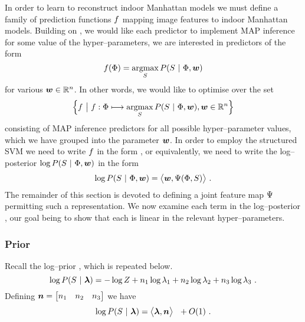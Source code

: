 In order to learn to reconstruct indoor Manhattan models we must
define a family of prediction functions $\Predictor$ mapping image
features to indoor Manhattan models. Building on ,
we would like each predictor to implement MAP inference for some
value of the hyper--parameters, \ie we are interested in predictors of
the form
\begin{equation}
  \label{eq:map-predictor}
  \Predictor(\Features) = 
  \argmax_{\Seam}\limits P(\Seam ~|~ \Features,\Model)
\end{equation}
for various $\Model\in\Reals^n$. In other words, we would like to
optimise over the set
\begin{equation}
  \Bigl\{ 
    \Predictor ~\bigl|~
    \Predictor: \Features \longmapsto 
    \argmax_{\Seam}\limits P(\Seam ~|~ \Features,\Model), \Model\in\Reals^n
  \Bigr\}
\end{equation}
consisting of MAP inference predictors for all possible
hyper--parameter values, which we have grouped into the parameter
$\Model$. In order to employ the structured SVM we need to write
$\Predictor$ in the form , or equivalently, we need
to write the log--posterior $\log P(\Seam ~|~ \Features,\Model)$ in the form
\begin{equation}
  \log P(\Seam ~|~ \Features,\Model)
  =
  \bigl\langle \Model, \JointFtr(\Features,\Seam) \bigr\rangle ~.
\end{equation}
The remainder of this section is devoted to defining a joint feature
map $\JointFtr$ permitting such a representation. We now examine each
term in the log--posterior , our goal being to
show that each is linear in the relevant hyper--parameters.

\subsubsection{Prior}
Recall the log--prior , which is repeated
below.
\begin{equation}
  \label{eq:log-scene-prior2}
  \log P(\Seam ~|~ \Penalties) =
    -\log Z +
    n_1\log\PenaltyConc + 
    n_2\log\PenaltyConv + 
    n_3\log\PenaltyOccl~.
\end{equation}
Defining $\Counts=\begin{bmatrix}n_1&n_2&n_3\end{bmatrix}$ we have
\begin{equation}
  \label{eq:linear-prior}
  \log P(\Seam ~|~ \Penalties) 
  =
  \bigl\langle \Penalties, \Counts \bigr\rangle ~~ + O(1) ~.
\end{equation}

